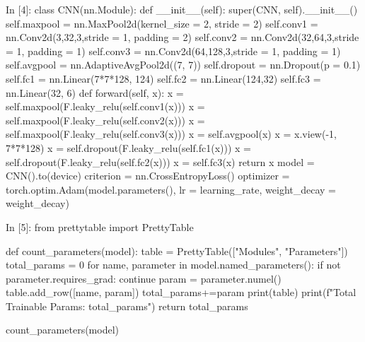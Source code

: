 \documentclass[12pt, a4paper]{article}
\begin{document}
\begin{python}
In [4]: class CNN(nn.Module):
          def __init__(self):
            super(CNN, self).__init__()
            self.maxpool = nn.MaxPool2d(kernel_size = 2, stride = 2)
            self.conv1 = nn.Conv2d(3,32,3,stride = 1, padding = 2)
            self.conv2 = nn.Conv2d(32,64,3,stride = 1, padding = 1)
            self.conv3 = nn.Conv2d(64,128,3,stride = 1, padding = 1)
            self.avgpool = nn.AdaptiveAvgPool2d((7, 7))
            self.dropout = nn.Dropout(p = 0.1)
            self.fc1 = nn.Linear(7*7*128, 124)
            self.fc2 = nn.Linear(124,32)
            self.fc3 = nn.Linear(32, 6)
          def forward(self, x):
            x = self.maxpool(F.leaky_relu(self.conv1(x)))
            x = self.maxpool(F.leaky_relu(self.conv2(x)))
            x = self.maxpool(F.leaky_relu(self.conv3(x)))
            x = self.avgpool(x)
            x = x.view(-1, 7*7*128)
            x = self.dropout(F.leaky_relu(self.fc1(x)))
            x = self.dropout(F.leaky_relu(self.fc2(x)))
            x = self.fc3(x)
            return x
        model = CNN().to(device)
        criterion = nn.CrossEntropyLoss()
        optimizer = torch.optim.Adam(model.parameters(), lr = learning_rate, weight_decay = weight_decay)
\end{python}
\newpage
\begin{python}
In [5]: from prettytable import PrettyTable
        
        def count_parameters(model):
            table = PrettyTable(["Modules", "Parameters"])
            total_params = 0
            for name, parameter in model.named_parameters():
                if not parameter.requires_grad: 
                    continue
                param = parameter.numel()
                table.add_row([name, param])
                total_params+=param
            print(table)
            print(f"Total Trainable Params: {total_params}")
            return total_params
        
        count_parameters(model)
\end{python}
\end{document}
